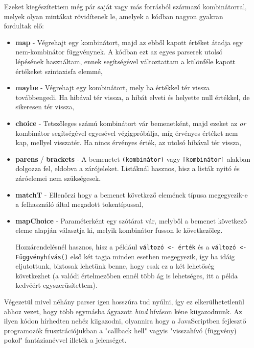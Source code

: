Ezeket kiegészítettem még pár saját vagy más forrásból származó kombinátorral, melyek olyan mintákat rövidítenek le, amelyek a kódban nagyon gyakran fordultak elő:

\begin{itemize}
    \item \textbf{map} - Végrehajt egy kombinátort, majd az ebből kapott értéket átadja egy nem-kombinátor függvénynek. A kódban ezt az egyes parserek utolsó lépésének használtam, ennek segítségével változtattam a különféle kapott értékeket szintaxisfa elemmé,
    \item \textbf{maybe} - Végrehajt egy kombinátort, mely ha értékkel tér vissza továbbengedi. Ha hibával tér vissza, a hibát elveti és helyette null értékkel, de sikeresen tér vissza,
    \item \textbf{choice} - Tetszőleges számú kombinátort vár bemenetként, majd ezeket az \textit{or} kombinátor segítségével egyesével végigpróbálja, míg érvényes értéket nem kap, mellyel visszatér. Ha nincs érvényes érték, az utolsó hibával tér vissza,
    \item \textbf{parens} / \textbf{brackets} - A bemenetet \verb_(kombinátor)_ vagy \verb_[kombinátor]_ alakban dolgozza fel, eldobva a zárójeleket. Listáknál hasznos, hisz a listák nyitó és záróelemei nem szükségesek.
    \item \textbf{matchT} - Ellenőrzi hogy a bemenet következő elemének típusa megegyezik-e a felhasználó által megadott tokentípussal,
    \item \textbf{mapChoice} - Paraméterként egy szótárat vár, melyből a bemenet következő eleme alapján választja ki, melyik kombinátor fusson le következőleg.
    
    Hozzárendelésnél hasznos, hisz a például \texttt{változó <- érték} és a \texttt{változó <- Függvényhívás()} első két tagja minden esetben megegyezik, így ha idáig eljutottunk, biztosak lehetünk benne, hogy csak ez a két lehetőség következhet (a valódi értelmezőben ennél több ág is lehetséges, itt a példa kedvéért egyszerűsítettem).
\end{itemize}

Végezetül mivel néhány parser igen hosszúra tud nyúlni, így ez elkerülhetetlenül ahhoz vezet, hogy több egymásba ágyazott \textit{bind} híváson kéne kiigazodnunk. Az ilyen kódon hírhedten nehéz kiigazodni, olyannira hogy a JavaScriptben fejlesztő programozók frusztrációjukban a "callback hell" vagyis "visszahívó (függvény) pokol" fantázianévvel illeték a jelenséget.


